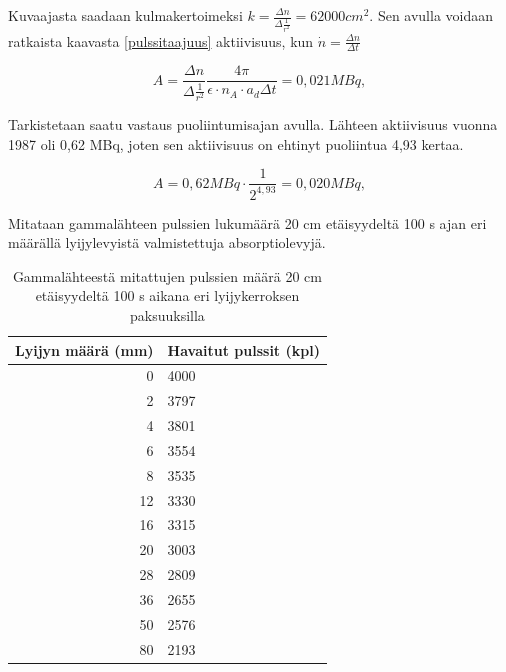 \documentclass[a4paper,11pt]{article}
\begin{document}
Kuvaajasta saadaan kulmakertoimeksi $k = \frac{\Delta{n}}{\Delta \frac{1}{r^2}} = 62 000 cm^2$. Sen avulla voidaan ratkaista kaavasta \ref{pulssitaajuus} aktiivisuus, kun $\dot{n} = \frac{\Delta n}{\Delta t}$ 

\begin{equation}
  A = \frac{\Delta n}{\Delta \frac{1}{r^2}} \frac{4 \pi }{\epsilon \cdot n_A \cdot a_d \Delta t} = 0,021 MBq ,
\end{equation}

Tarkistetaan saatu vastaus puoliintumisajan avulla. Lähteen aktiivisuus vuonna 1987 oli 0,62 MBq, joten sen aktiivisuus on ehtinyt puoliintua 4,93 kertaa. 

\begin{equation}
  A = 0,62 {MBq} \cdot \frac{1}{2^{4,93}} = 0,020 {MBq} ,
\end{equation}

Mitataan gammalähteen pulssien lukumäärä 20 cm etäisyydeltä 100 s ajan eri määrällä lyijylevyistä valmistettuja absorptiolevyjä. 

\begin{table}[H]
\begin{center}
\caption{Gammalähteestä mitattujen pulssien määrä 20 cm etäisyydeltä 100 s aikana eri lyijykerroksen paksuuksilla}
\begin{tabular}{ | r | l | }
  \hline
Lyijyn määrä (mm) & Havaitut pulssit (kpl) \\ \hline
0 & 4000 \\ \hline
2 & 3797 \\ \hline
4 & 3801 \\ \hline
6 & 3554 \\ \hline
8 & 3535 \\ \hline
12 & 3330 \\ \hline
16 & 3315 \\ \hline
20 & 3003 \\ \hline
28 & 2809 \\ \hline
36 & 2655 \\ \hline
50 & 2576 \\ \hline
80 & 2193 \\ \hline

\end{tabular}
\end{center}
\end{table}
\end{document}
